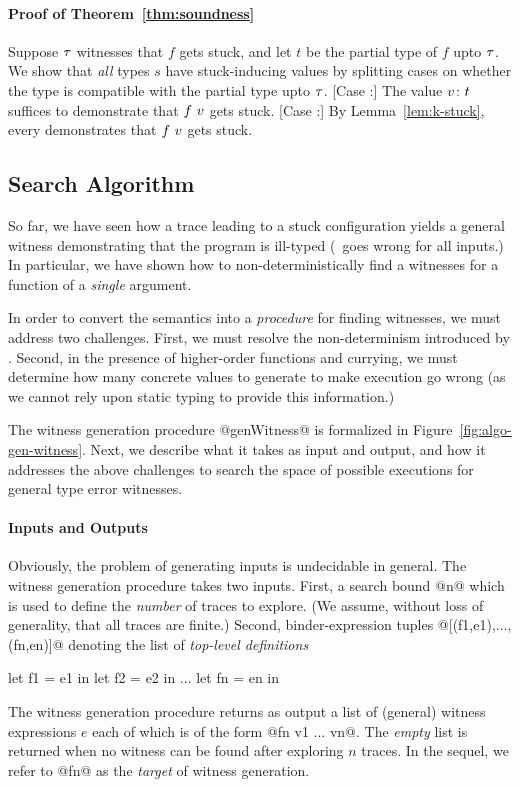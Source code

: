 \paragraph{Proof of Theorem~\ref{thm:soundness}}
%
Suppose $\tau$ witnesses that $f$ gets stuck,
and let $t$ be the partial type of $f$ upto $\tau$.
We show that \emph{all} types $s$ have stuck-inducing
values by splitting cases on whether the type is
compatible with the partial type upto $\tau$.
%
  [Case :]
   The value ${v} \colon {t}$ suffices to demonstrate that $f \ v$
   gets stuck.
  [Case :]
   By Lemma~\ref{lem:k-stuck}, every  demonstrates that
   $f \ v$ gets stuck.


\subsection{Search Algorithm}
\label{sec:search-algorithm}
%
So far, we have seen how a trace leading to a stuck configuration yields
a general witness demonstrating that the program is ill-typed (\ie\ goes
wrong for all inputs.)
In particular, we have shown how to non-deterministically find a witnesses
for a function of a \emph{single} argument.

In order to convert the semantics into a \emph{procedure} for finding
witnesses, we must address two challenges.
%
First, we must resolve the non-determinism introduced by \gensym.
%
Second, in the presence of higher-order functions and currying,
we must determine how many concrete values to generate to make
execution go wrong (as we cannot rely upon static typing to
provide this information.)

The witness generation procedure @genWitness@ is formalized in
Figure~\ref{fig:algo-gen-witness}.
%
Next, we describe what it takes as input and output, and how it
addresses the above challenges to search the space of possible
executions for general type error witnesses.

\paragraph{Inputs and Outputs}
%
Obviously, the problem of generating inputs is undecidable in general.
%
The witness generation procedure takes two inputs.
%
First, a search bound @n@ which is used to define the \emph{number} of
traces to explore. (We assume, without loss of generality, that all
traces are finite.)
%
Second, binder-expression tuples @[(f1,e1),...,(fn,en)]@
denoting the list of \emph{top-level definitions}
%
\begin{code}
  let f1 = e1 in
  let f2 = e2 in
  ...
  let fn = en in
\end{code}
%
The witness generation procedure returns as output a list of (general)
witness expressions $e$ each of which is of the form @fn v1 ... vn@.
%
The \emph{empty} list is returned when no witness can be found after
exploring $n$ traces.
%
In the sequel, we refer to @fn@ as the \emph{target} of witness generation.

